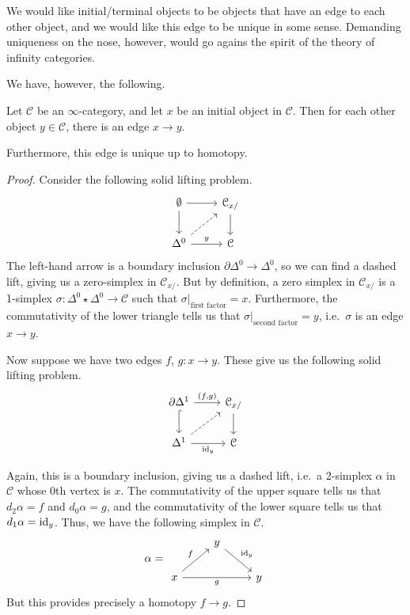 \documentclass[main.tex]{subfiles}
\begin{document}
We would like initial/terminal objects to be objects that have an edge to each other object, and we would like this edge to be unique in some sense. Demanding uniqueness on the nose, however, would go agains the spirit of the theory of infinity categories.

We have, however, the following.
\begin{proposition}
  Let $\mathcal{C}$ be an $\infty$-category, and let $x$ be an initial object in $\mathcal{C}$. Then for each other object $y \in \mathcal{C}$, there is an edge $x \to y$.

  Furthermore, this edge is unique up to homotopy.
\end{proposition}
\begin{proof}
  Consider the following solid lifting problem.
  \begin{equation*}
    \begin{tikzcd}
      \emptyset
      \arrow[r]
      \arrow[d]
      & \mathcal{C}_{x/}
      \arrow[d]
      \\
      \Delta^{0}
      \arrow[ur, dashed]
      \arrow[r, "y"]
      & \mathcal{C}
    \end{tikzcd}
  \end{equation*}
  The left-hand arrow is a boundary inclusion $\partial \Delta^{0} \to \Delta^{0}$, so we can find a dashed lift, giving us a zero-simplex in $\mathcal{C}_{x/}$. But by definition, a zero simplex in $\mathcal{C}_{x/}$ is a 1-simplex $\sigma\colon \Delta^{0} \star \Delta^{0} \to \mathcal{C}$ such that $\sigma|_{\text{first factor}} = x$. Furthermore, the commutativity of the lower triangle tells us that $\sigma|_{\text{second factor}} = y$, i.e.\ $\sigma$ is an edge $x \to y$.

  Now suppose we have two edges $f$, $g\colon x \to y$. These give us the following solid lifting problem.
  \begin{equation*}
    \begin{tikzcd}
      \partial \Delta^{1}
      \arrow[r, "{(f, g)}"]
      \arrow[d, hookrightarrow]
      & \mathcal{C}_{x/}
      \arrow[d]
      \\
      \Delta^{1}
      \arrow[r, swap, "\id_{y}"]
      \arrow[ur, dashed]
      & \mathcal{C}
    \end{tikzcd}
  \end{equation*}

  Again, this is a boundary inclusion, giving us a dashed lift, i.e.\ a 2-simplex $\alpha$ in $\mathcal{C}$ whose 0th vertex is $x$. The commutativity of the upper square tells us that $d_{2}\alpha = f$ and $d_{0}\alpha = g$, and the commutativity of the lower square tells us that $d_{1}\alpha = \mathrm{id}_{y}$. Thus, we have the following simplex in $\mathcal{C}$.
  \begin{equation*}
    \alpha =
    \begin{tikzcd}
      & y
      \arrow[dr, "\id_{y}"]
      \\
      x
      \arrow[ur, "f"]
      \arrow[rr, swap, "g"]
      && y
    \end{tikzcd}
  \end{equation*}
  But this provides precisely a homotopy $f \to g$.
\end{proof}
\end{document}
